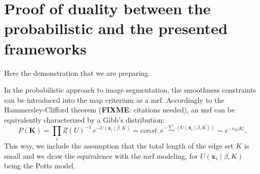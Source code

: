 
%

\appendix

\section{Proof of duality between the probabilistic and the presented frameworks}
Here the demonstration that we are preparing.


In the probabilistic approach to image segmentation, the smoothness constraints
can be introduced into the \gls{map} criterium as a \gls{mrf}. Accordingly to the
Hammersley-Clifford theorem (\textbf{FIXME}: citations needed), an \gls{mrf} can
be equivalently characterized by a Gibb's distribution:
\begin{equation}
P(\mathbf{K})=\underset{i}{\prod} Z(U)^{-1}\,e^{-U(\mathbf{x}_i \mid \beta,K)} = \mathit{const.}\,e^{- \sum\limits_i \left( U(\mathbf{x}_i \mid \beta,K) \right) } \sim e^{-\nu_B \left| K \right| }.
\end{equation}
This way, we include the assumption that the total length of the edge set $K$ is small
and we draw the equivalence with the \gls{mrf} modeling, for $U(\mathbf{x}_i \mid \beta,K)$
being the Potts model.

